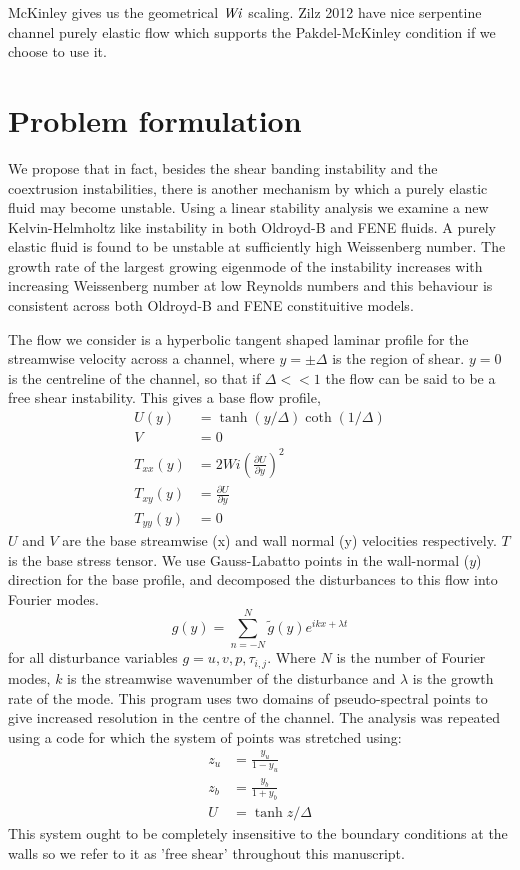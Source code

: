 \documentclass{jfm}
\newcommand\Wi{\mbox{\textit{Wi}}}
\newcommand{\dy}[1]{\frac{\partial #1}{\partial y}}
\begin{document}
McKinley \citep{McKinley1996} gives us the geometrical $\Wi$ scaling. Zilz 2012
\citep{Zilz2012} have nice serpentine channel purely elastic flow which
supports the Pakdel-McKinley condition if we choose to use it.

\section{Problem formulation}\label{sec:KH_problem_formulation}

We propose that in fact, besides the shear banding instability and the
coextrusion instabilities, there is another mechanism by which a purely elastic
fluid may become unstable. Using a linear stability analysis we examine a new
Kelvin-Helmholtz like instability in both Oldroyd-B and FENE fluids. A purely
elastic fluid is found to be unstable at sufficiently high Weissenberg number.
The growth rate of the largest growing eigenmode of the instability increases
with increasing Weissenberg number at low Reynolds numbers and this behaviour
is consistent across both Oldroyd-B and FENE constituitive models.

The flow we consider is a hyperbolic tangent shaped laminar profile for the
streamwise velocity across a channel, where $y = \pm \Delta$ is the region of
shear. $y=0$ is the centreline of the channel, so that if $\Delta << 1$ the
flow can be said to be a free shear instability.  This gives a base flow
profile, 
\begin{align} 
    U(y) &= \tanh \left( y/\Delta
    \right) \coth \left( 1/\Delta \right) \nonumber\\ V &= 0 \nonumber \\
    T_{xx}(y) &= 2 Wi \left( \dy{U} \right)^{2} \nonumber \\ T_{xy}(y) &=
    \dy{U} \nonumber \\ T_{yy}(y) &= 0 \label{eq:KH_laminar_profile}
\end{align}
$U$ and $V$ are the base streamwise (x) and wall normal (y) velocities
respectively. $T$ is the base stress tensor. We use Gauss-Labatto points in the
wall-normal ($y$) direction for the base profile, and decomposed the
disturbances to this flow into Fourier modes.  
\begin{equation} 
    g(y) = \sum\limits_{n=-N}^{N} \widetilde{g}(y) e^{ikx + \lambda t} 
\end{equation}
for all disturbance variables $g = u, v, p, \tau_{i,j}$. Where $N$ is the
number of Fourier modes, $k$ is the streamwise wavenumber of the disturbance
and $\lambda$ is the growth rate of the mode. This program uses two domains of
pseudo-spectral points to give increased resolution in the centre of the
channel. The analysis was repeated using a code for which the system of points
was stretched using: 
\begin{align} 
    z_{u} &= \frac{y_{u}}{1-y_{u}} \\
    z_{b} &= \frac{y_{b}}{1+y_{b}} \\ U     &= \tanh{z/\Delta}
    \label{eq:KH_inf_profile} 
\end{align} 
This system ought to be completely insensitive to the boundary conditions at
the walls so we refer to it as 'free shear' throughout this manuscript. 
\end{document}
